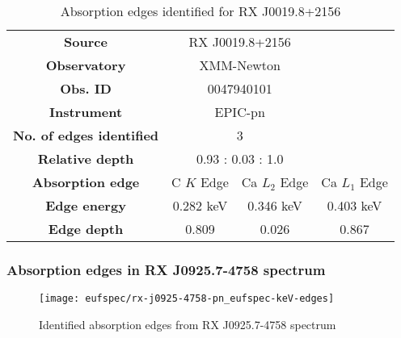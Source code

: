 				\renewcommand{\arraystretch}{1.5}
				\begin{table}[!htb]
					\centering
					\caption{Absorption edges identified for RX J0019.8+2156}
					\label{tab:absedge-rx-j0019}
					\begin{tabular}{cccc}
						\hline
						\textbf{Source} & \multicolumn{2}{c}{RX J0019.8+2156} & {} \\
						\textbf{Observatory} & \multicolumn{2}{c}{XMM-Newton}& {} \\
						\textbf{Obs. ID} & \multicolumn{2}{c}{0047940101}& {} \\
						\textbf{Instrument} & \multicolumn{2}{c}{EPIC-pn}& {} \\
						\textbf{No. of edges identified} & \multicolumn{2}{c}{3}& {} \\
						\textbf{Relative depth} & \multicolumn{2}{c}{0.93 : 0.03 : 1.0} & {} \\ \hline
						\textbf{Absorption edge} & {C $K$ Edge} & {Ca $L_2$ Edge} & {Ca $L_1$ Edge} \\
						\textbf{Edge energy} & {0.282 keV} & {0.346 keV} & {0.403 keV} \\
						\textbf{Edge depth} & {0.809} & {0.026} & {0.867} \\ \hline
					\end{tabular}
				\end{table}
				\renewcommand{\arraystretch}{2.2}
			
			
			\newpage
			\subsubsection*{Absorption edges in RX J0925.7-4758 spectrum}
				\begin{figure}[h!]
					\centering
					\texttt{[image: eufspec/rx-j0925-4758-pn\_eufspec-keV-edges]}
					\caption{Identified absorption edges from RX J0925.7-4758 spectrum}
					\label{result:absedge-rx-j0925}
				\end{figure}
				
